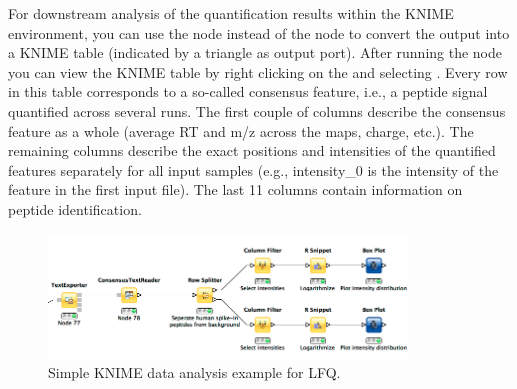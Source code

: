 For downstream analysis of the quantification results within the KNIME environment, you can use the  node  instead of the  node to convert the output into a KNIME table (indicated by a triangle as output port). 
After running the node you can view the KNIME table by right clicking on the  and selecting .
Every row in this table corresponds to a so-called consensus feature, i.e., a peptide signal quantified across several runs. The first couple of columns describe the consensus feature as a whole (average RT and m/z across the maps, charge, etc.). The remaining columns describe the exact positions and intensities of the quantified features separately for all input samples (e.g., intensity\_0 is the intensity of the feature in the first input file). The last 11 columns contain information on peptide identification.

\begin{figure}[htbp]
  \centering
  \includegraphics[width=0.85\textwidth]{graphics/labelfree/data_analysis}
  \caption{Simple KNIME data analysis example for LFQ.}
  \label{fig:lfq_data_analysis}
\end{figure}

